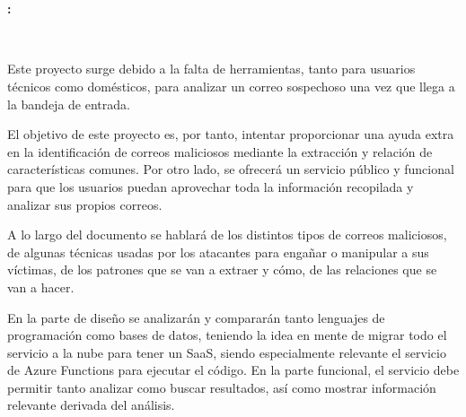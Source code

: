 \chapter*{}


%



\cleardoublepage
\thispagestyle{empty}

\begin{center}
{\large\bfseries \myTitle: \mySubTitle}\\
\end{center}
\begin{center}
\myName\\
\end{center}

\bigskip

\vspace{0.7cm}
\bigskip

Este proyecto surge debido a la falta de herramientas, tanto para usuarios técnicos como domésticos, para analizar un correo sospechoso una vez que llega a la bandeja de entrada. 


El objetivo de este proyecto es, por tanto, intentar proporcionar una ayuda extra en la identificación de correos maliciosos mediante la extracción y relación de características comunes. Por otro lado, se ofrecerá un servicio público y funcional para que los usuarios puedan aprovechar toda la información recopilada y analizar sus propios correos. 


A lo largo del documento se hablará de los distintos tipos de correos maliciosos, de algunas técnicas usadas por los atacantes para engañar o manipular a sus víctimas, de los patrones que se van a extraer y cómo, de las relaciones que se van a hacer.

En la parte de diseño se analizarán y compararán tanto lenguajes de programación como bases de datos, teniendo la idea en mente de migrar todo el servicio a la nube para tener un SaaS, siendo especialmente relevante el servicio de Azure Functions para ejecutar el código. 
En la parte funcional, el servicio debe permitir tanto analizar como buscar resultados, así como mostrar información relevante derivada del análisis.

